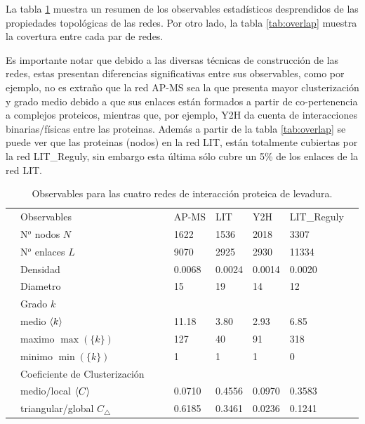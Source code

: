 La tabla \ref{tab:obs} muestra un resumen de los observables estad\'isticos desprendidos de las propiedades topol\'ogicas de las redes. Por otro lado, la tabla \ref{tab:overlap} muestra la covertura entre cada par de redes. 

Es importante notar que debido a las diversas t\'ecnicas de construcci\'on de las redes, estas presentan diferencias significativas entre sus observables, como por ejemplo, no es extraño que la red AP-MS sea la que presenta mayor clusterizaci\'on y grado medio debido a que sus enlaces est\'an formados a partir de co-pertenencia a complejos proteicos, mientras que, por ejemplo, Y2H da cuenta de interacciones binarias/f\'isicas entre las proteinas. Adem\'as a partir de la tabla \ref{tab:overlap} se puede ver que las proteinas (nodos) en la red LIT, est\'an totalmente cubiertas por la red LIT\_Reguly, sin embargo esta \'ultima s\'olo cubre un 5\% de los enlaces de la red LIT.



\begin{table}[!ht]
    \centering
    \caption{\label{tab:obs}Observables para las cuatro redes de interacci\'on proteica de levadura.}
    {\scriptsize
    \begin{tabularx}{1\columnwidth}{XlX|XXXXXX}
        \hline\hline
        &\multirow{2}{*}{Observables}        &&& \multirow{2}{*}{AP-MS} & \multirow{2}{*}{LIT} & \multirow{2}{*}{Y2H} & \multirow{2}{*}{LIT\_Reguly} &\\ 
        &&&&&&\\
        \hline
        &N$^o$ nodos $N$    &&& 1622 & 1536 & 2018 &  3307 &\\
        &N$^o$ enlaces $L$  &&& 9070 & 2925 & 2930 & 11334 &\\
        &Densidad           &&& 0.0068 & 0.0024 & 0.0014 & 0.0020&\\
        &Diametro           &&& 15 & 19 & 14 & 12\\
        \hline
        &Grado $k$&&&\\
        &\quad medio  $\left\langle k\right\rangle$     &&& 11.18 & 3.80& 2.93 & 6.85 &\\
        &\quad maximo $\max(\{k\})$  &&& 127  & 40   & 91 & 318&\\ 
        &\quad minimo $\min(\{k\})$  &&& 1    & 1    & 1 & 0&\\ 
        \hline
        &Coeficiente de Clusterizaci\'on&&&\\
        \hline
        &\quad medio/local $\left\langle C\right\rangle$               &&& 0.0710 & 0.4556 & 0.0970 & 0.3583&\\
        &\quad triangular/global $C_\bigtriangleup$ &&& 0.6185 & 0.3461 & 0.0236 & 0.1241&\\
        \hline\hline
    \end{tabularx}
    }
\end{table}

